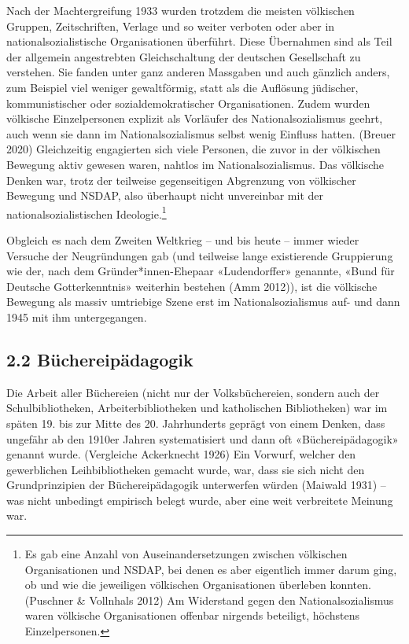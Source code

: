 \documentclass[a4paper,
fontsize=11pt,
oneside,
numbers=noperiodatend,
parskip=half-,
bibliography=totoc,
final
]{scrartcl}
\begin{document}
Nach der Machtergreifung 1933 wurden trotzdem die meisten völkischen
Gruppen, Zeitschriften, Verlage und so weiter verboten oder aber in
nationalsozialistische Organisationen überführt. Diese Übernahmen sind
als Teil der allgemein angestrebten Gleichschaltung der deutschen
Gesellschaft zu verstehen. Sie fanden unter ganz anderen Massgaben und
auch gänzlich anders, zum Beispiel viel weniger gewaltförmig, statt als
die Auflösung jüdischer, kommunistischer oder sozialdemokratischer
Organisationen. Zudem wurden völkische Einzelpersonen explizit als
Vorläufer des Nationalsozialismus geehrt, auch wenn sie dann im
Nationalsozialismus selbst wenig Einfluss hatten. (Breuer 2020)
Gleichzeitig engagierten sich viele Personen, die zuvor in der
völkischen Bewegung aktiv gewesen waren, nahtlos im Nationalsozialismus.
Das völkische Denken war, trotz der teilweise gegenseitigen Abgrenzung
von völkischer Bewegung und NSDAP, also überhaupt nicht unvereinbar mit
der nationalsozialistischen Ideologie.\footnote{Es gab eine Anzahl von
  Auseinandersetzungen zwischen völkischen Organisationen und NSDAP, bei
  denen es aber eigentlich immer darum ging, ob und wie die jeweiligen
  völkischen Organisationen überleben konnten. (Puschner \& Vollnhals
  2012) Am Widerstand gegen den Nationalsozialismus waren völkische
  Organisationen offenbar nirgends beteiligt, höchstens Einzelpersonen.}

Obgleich es nach dem Zweiten Weltkrieg -- und bis heute -- immer wieder
Versuche der Neugründungen gab (und teilweise lange existierende
Gruppierung wie der, nach dem Gründer*in\-nen-Ehepaar «Ludendorffer»
genannte, «Bund für Deutsche Gotterkenntnis» weiterhin bestehen (Amm
2012)), ist die völkische Bewegung als massiv umtriebige Szene erst im
Nationalsozialismus auf- und dann 1945 mit ihm untergegangen.

\hypertarget{buxfcchereipuxe4dagogik}{%
\subsection{2.2 Büchereipädagogik}\label{buxfcchereipuxe4dagogik}}

Die Arbeit aller Büchereien (nicht nur der Volksbüchereien, sondern auch
der Schulbibliotheken, Arbeiterbibliotheken und katholischen
Bibliotheken) war im späten 19. bis zur Mitte des 20. Jahrhunderts
geprägt von einem Denken, dass ungefähr ab den 1910er Jahren
systematisiert und dann oft «Büchereipädagogik» genannt wurde.
(Vergleiche Ackerknecht 1926) Ein Vorwurf, welcher den gewerblichen
Leihbibliotheken gemacht wurde, war, dass sie sich nicht den
Grundprinzipien der Büchereipädagogik unterwerfen würden (Maiwald 1931)
-- was nicht unbedingt empirisch belegt wurde, aber eine weit
verbreitete Meinung war.
\end{document}
